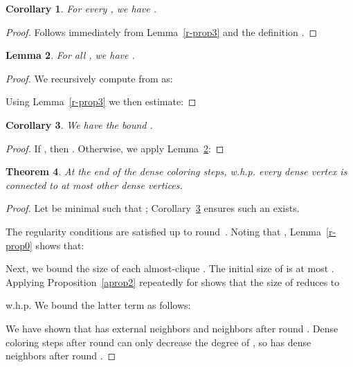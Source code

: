 \documentclass[11pt]{amsart}
\newtheorem{theorem}{Theorem}[section]
\newtheorem{lemma}[theorem]{Lemma}
\newtheorem{corollary}[theorem]{Corollary}
\begin{document}
\begin{corollary}
\label{gamma-cor}
For every , we have .
\end{corollary}
\begin{proof}
Follows immediately from Lemma~\ref{r-prop3} and the definition .
\end{proof}

\begin{lemma}
\label{r-prop2}
For all , we have .
\end{lemma}
\begin{proof}
We recursively compute  from  as:

Using Lemma~\ref{r-prop3} we then estimate:

\end{proof}

\begin{corollary}
\label{cor-dbound}
We have the bound .
\end{corollary}
\begin{proof}
If , then . Otherwise, we apply Lemma~\ref{r-prop2}:

\end{proof}

\iffalse
\textbf{Expository remark:} Corollary~\ref{cor-dbound} explains why we selected  and ran our coloring steps for  rounds. Suppose instead we set~ and ran  dense coloring steps, for some~. At the end of these steps, we would have . This is close to  (differing in only a sub-polynomial term), which implies that we have hardly made any progress in reducing the number of uncolored vertices.
\fi

\begin{theorem}
\label{th1}
At the end of the dense coloring steps, w.h.p. every dense vertex is connected to at most  other dense vertices.
\end{theorem}
\begin{proof}
Let  be minimal such that ; Corollary~\ref{cor-dbound} ensures such an  exists. 

The regularity conditions are satisfied up to round~. Noting that , Lemma~\ref{r-prop0} shows that:


Next, we bound the size of each almost-clique . The initial size of  is at most . Applying Proposition~\ref{aprop2} repeatedly for  shows that the size of  reduces to 

w.h.p. We bound the latter term as follows:
{\allowdisplaybreaks

}

We have shown that   has  external neighbors and   neighbors  after round . Dense coloring steps after round  can only decrease the degree of , so  has  dense neighbors after round . 
\end{proof}
\end{document}
